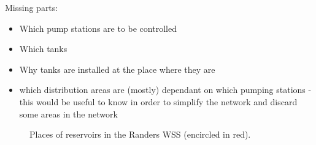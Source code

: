 Missing parts:
\begin{itemize}
  \item Which pump stations are to be controlled
  \item Which tanks 
  \item Why tanks are installed at the place where they are
  \item which distribution areas are (mostly) dependant on which pumping stations - this would be useful to know in order to simplify the network and discard some areas in the network 
\end{itemize}

\begin{figure}[H]
\centering
 
\caption{Places of reservoirs in the Randers WSS (encircled in red).}
\label{fig:reservoirs_epanet}
\end{figure}